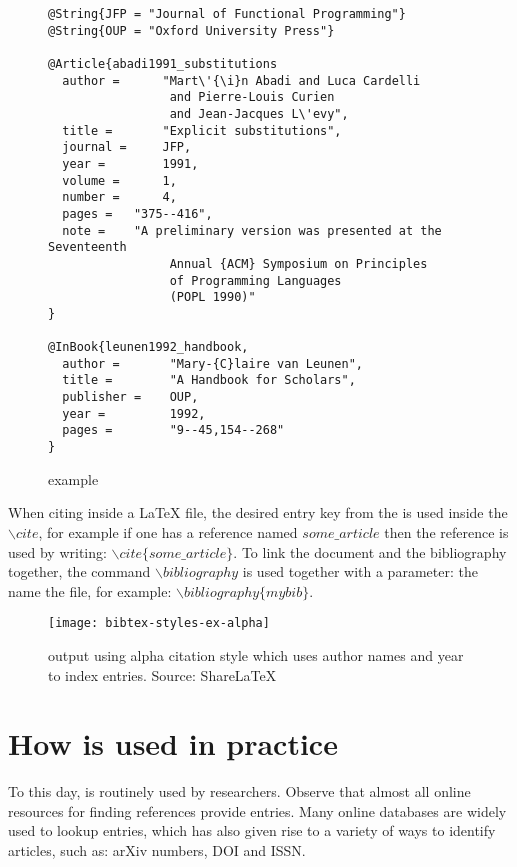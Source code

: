 \begin{figure}
  \centering
  \begin{small}
\begin{verbatim}
@String{JFP = "Journal of Functional Programming"}
@String{OUP = "Oxford University Press"}

@Article{abadi1991_substitutions
  author =      "Mart\'{\i}n Abadi and Luca Cardelli
                 and Pierre-Louis Curien
                 and Jean-Jacques L\'evy",
  title =       "Explicit substitutions",
  journal =     JFP,
  year =        1991,
  volume =      1,
  number =      4,
  pages =	"375--416",
  note =	"A preliminary version was presented at the Seventeenth
                 Annual {ACM} Symposium on Principles
                 of Programming Languages
                 (POPL 1990)"
}

@InBook{leunen1992_handbook,
  author =       "Mary-{C}laire van Leunen",
  title =        "A Handbook for Scholars",
  publisher =    OUP,
  year =         1992,
  pages =        "9--45,154--268"
}
\end{verbatim}
  \end{small}
  \caption{{\bibtex} example}
\label{fig:bibtex_example}
\end{figure}

When citing inside a {\LaTeX} file, the desired entry key from the
{\bibtex} is used inside the ${\backslash}cite$, for example if one
has a reference named $some\_article$ then the reference is used by
writing: ${\backslash}cite\{some\_article\}$.  To link the document
and the bibliography together, the command ${\backslash}bibliography$
is used together with a parameter: the name the {\bibtex} file, for
example: ${\backslash}bibliography\{mybib\}$.

\begin{figure}
  \centering
  \texttt{[image: bibtex-styles-ex-alpha]}
  \caption{{\bibtex} output using alpha citation style which uses
    author names and year to index entries.  Source:
    ShareLaTeX~\cite{sharelatex2016_styles}}
\label{fig:bibtex_example_alpha}
\end{figure}


\section{How {\bibtex} is used in practice}
\label{sec:how_bibtex_is_used_today}

To this day, {\bibtex} is routinely used by researchers.  Observe that
almost all online resources for finding references provide {\bibtex}
entries.  Many online databases are widely used to lookup entries,
which has also given rise to a variety of ways to identify articles,
such as: arXiv numbers, DOI and ISSN.

